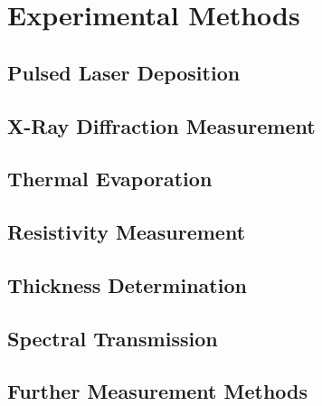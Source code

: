 \chapter{Experimental Methods}

\section{Pulsed Laser Deposition}
    

\section{X-Ray Diffraction Measurement}
    


\section{Thermal Evaporation}
    
\section{Resistivity Measurement}
    
        \label{Sec:Methods_vanDerPauw}
\section{Thickness Determination}
    
\section{Spectral Transmission}
    
        \label{Sec:Methods_transmission}
\section{Further Measurement Methods}
    